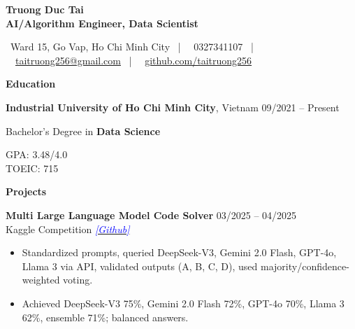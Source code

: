 \documentclass[10pt]{article}
\begin{document}
\begin{center}
    {\large \textbf{Truong Duc Tai}} \\
    \textbf{AI/Algorithm Engineer, Data Scientist}
\end{center}

\begin{center}
    \scriptsize
    \faMapMarker \ Ward 15, Go Vap, Ho Chi Minh City \ | \ 
    \faPhone \ 0327341107 \ | \ 
    \faEnvelope \ \href{mailto:taitruong256@gmail.com}{taitruong256@gmail.com} \ | \ 
    \faGithub \ \href{https://github.com/taitruong256}{github.com/taitruong256}
\end{center}

\begin{center}
    \vspace{0.05cm}
    \hrulefill
    \vspace{0.05cm}
\end{center}

\begin{center}
    \textbf{Education}
\end{center}

\textbf{Industrial University of Ho Chi Minh City}, Vietnam \hfill 09/2021 -- Present \\
\begin{minipage}[t]{0.65\textwidth}
    Bachelor’s Degree in \textbf{Data Science}
\end{minipage}%
\begin{minipage}[t]{0.35\textwidth}
    \raggedleft
    GPA: 3.48/4.0 \\
    TOEIC: 715
\end{minipage}

\begin{center}
    \vspace{0.05cm}
    \hrulefill
    \vspace{0.05cm}
\end{center}

\begin{center}
    \textbf{Projects}
\end{center}

\textbf{Multi Large Language Model Code Solver} \hfill 03/2025 -- 04/2025 \\
Kaggle Competition \hfill \href{https://github.com/taitruong256/CodeMMLU}{\textcolor{blue}{\textit{[Github]}}}

\begin{itemize}[noitemsep, topsep=0pt, partopsep=0pt, parsep=0pt]
    \item Standardized prompts, queried DeepSeek-V3, Gemini 2.0 Flash, GPT-4o, Llama 3 via API, validated outputs (A, B, C, D), used majority/confidence-weighted voting.
    \item Achieved DeepSeek-V3 75\%, Gemini 2.0 Flash 72\%, GPT-4o 70\%, Llama 3 62\%, ensemble 71\%; balanced answers.
\end{itemize}
\end{document}

